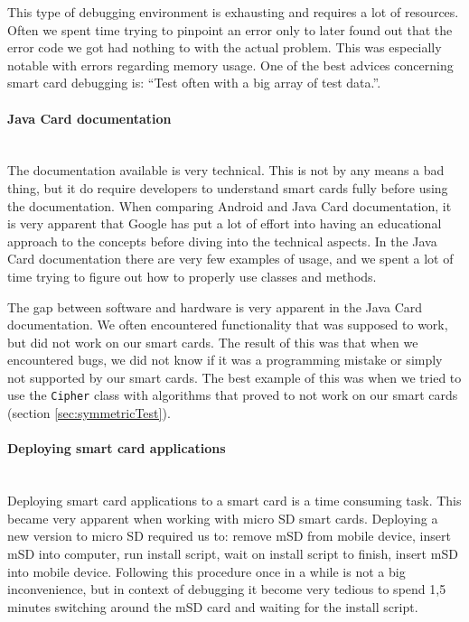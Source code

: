 This type of debugging environment is exhausting and requires a lot of resources. Often we spent time trying to pinpoint an error only to later found out that the error code we got had nothing to with the actual problem. This was especially notable with errors regarding memory usage. One of the best advices concerning smart card debugging is: ``Test often with a big array of test data.''.

\paragraph{Java Card documentation}\mbox{}\\
The documentation available is very technical. This is not by any means a bad thing, but it do require developers to understand smart cards fully before using the documentation. When comparing Android and Java Card documentation, it is very apparent that Google has put a lot of effort into having an educational approach to the concepts before diving into the technical aspects. In the Java Card documentation there are very few examples of usage, and we spent a lot of time trying to figure out how to properly use classes and methods.

The gap between software and hardware is very apparent in the Java Card documentation. We often encountered functionality that was supposed to work, but did not work on our smart cards. The result of this was that when we encountered bugs, we did not know if it was a programming mistake or simply not supported by our smart cards. The best example of this was when we tried to use the \texttt{Cipher} class with algorithms that proved to not work on our smart cards (section \ref{sec:symmetricTest}).

\paragraph{Deploying smart card applications}\mbox{}\\
Deploying smart card applications to a smart card is a time consuming task. This became very apparent when working with micro SD smart cards. Deploying a new version to micro SD required us to: remove mSD from mobile device, insert mSD into computer, run install script, wait on install script to finish, insert mSD into mobile device. Following this procedure once in a while is not a big inconvenience, but in context of debugging it become very tedious to spend 1,5 minutes switching around the mSD card and waiting for the install script.

